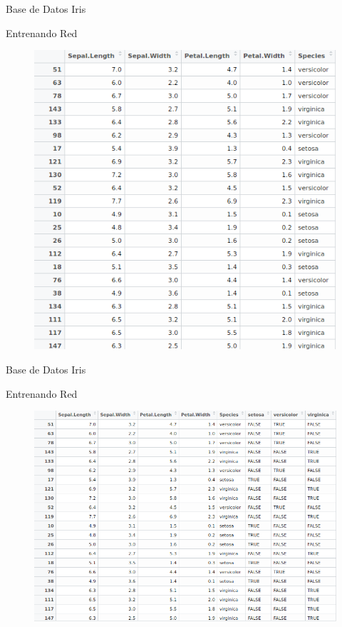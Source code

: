 \documentclass{beamer}
\begin{document}
\begin{frame}{Base de Datos Iris}
\begin{block}{Entrenando Red}
\begin{figure}
\includegraphics[scale=0.3]{tablairis.png}
\centering
\end{figure}
\end{block}
\end{frame}

\begin{frame}{Base de Datos Iris}
\begin{block}{Entrenando Red}
\begin{figure}
\includegraphics[scale=0.3]{irisespecie.png}
\centering
\end{figure}
\end{block}
\end{frame}
\end{document}
